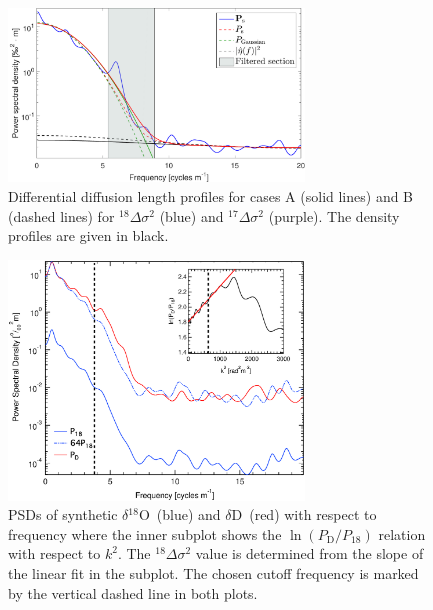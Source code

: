 \documentclass[11pt, draftcls, onecolumn]{IEEEtran} %
\numberwithin{equation}{section}
\numberwithin{table}{section}
\numberwithin{figure}{section}
\newcommand{\delOx}{$\delta{}^{18}\mathrm{O}$}
\newcommand{\delD}{$\delta\mathrm{D}$}
\begin{document}
\begin{figure}[]	
\vspace*{2mm}	
\begin{center}		
	\includegraphics[width=0.7\textwidth]{Figure_6}		
	\caption{Differential diffusion length profiles for cases A (solid lines) and B 
		(dashed lines) for ${}^{18}\Delta\sigma^2$  (blue) and ${}^{17}\Delta\sigma^2$ (purple).
		The density profiles are given in black.} 		
	\label{fig:diff_diffusion_example}	
\end{center}
\end{figure}



\begin{figure}[]	
\vspace*{2mm}	
\begin{center}		
	\includegraphics[width=0.7\textwidth]{Figure_7}		
	\caption{PSDs of synthetic \delOx~(blue) and \delD~(red) with respect to frequency where
		the inner subplot shows the $\ln \left({P_\mathrm{D}}/{P_{18}}\right)$ relation with respect to  $k^2$. 
		The ${}^{18}\Delta\sigma^2$ value is determined from the slope of the linear fit in the subplot.
		The chosen cutoff frequency is marked by the vertical dashed line in both plots.} 		
	\label{fig:spectral_diff_diffusion_example}	
\end{center}
\end{figure}
\end{document}
